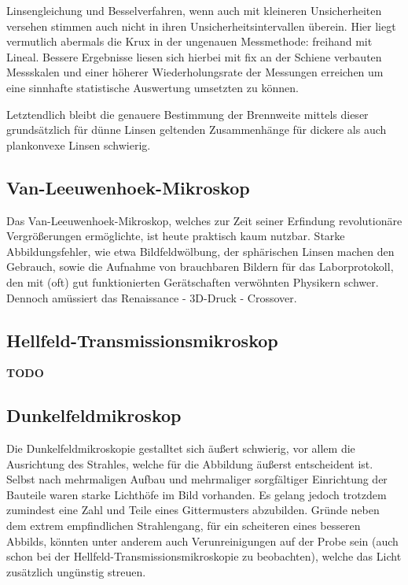 \documentclass[ngerman]{scrartcl}
\begin{document}
Linsengleichung und Besselverfahren, wenn auch mit kleineren Unsicherheiten versehen stimmen auch nicht in ihren Unsicherheitsintervallen überein. Hier liegt vermutlich abermals die Krux in der ungenauen Messmethode: freihand mit Lineal. Bessere Ergebnisse liesen sich hierbei mit fix an der Schiene verbauten Messskalen und einer höherer Wiederholungsrate der Messungen erreichen um eine sinnhafte statistische Auswertung umsetzten zu können.

Letztendlich bleibt die genauere Bestimmung der Brennweite mittels dieser grundsätzlich für dünne Linsen geltenden Zusammenhänge für dickere als auch plankonvexe Linsen schwierig.


\subsection{Van-Leeuwenhoek-Mikroskop}
\label{subsec:diskussion_Leeuwenhoek}

Das Van-Leeuwenhoek-Mikroskop, welches zur Zeit seiner Erfindung revolutionäre Vergrößerungen ermöglichte, ist heute praktisch kaum nutzbar. Starke Abbildungsfehler, wie etwa Bildfeldwölbung, der sphärischen Linsen machen den Gebrauch, sowie die Aufnahme von brauchbaren Bildern für das Laborprotokoll, den mit (oft) gut funktionierten Gerätschaften verwöhnten Physikern schwer. Dennoch amüssiert das Renaissance - 3D-Druck - Crossover.


\subsection{Hellfeld-Transmissionsmikroskop}
\label{subsec:diskussion_hellfeld}

\textbf{TODO}


\subsection{Dunkelfeldmikroskop}
\label{subsec:diskussion_dunkelfeldmikroskop}

Die Dunkelfeldmikroskopie gestalltet sich äußert schwierig, vor allem die Ausrichtung des Strahles, welche für die Abbildung äußerst entscheident ist. Selbst nach mehrmaligen Aufbau und mehrmaliger sorgfältiger Einrichtung der Bauteile waren starke Lichthöfe im Bild vorhanden. Es gelang jedoch trotzdem zumindest eine Zahl und Teile eines Gittermusters abzubilden. Gründe neben dem extrem empfindlichen Strahlengang, für ein scheiteren eines besseren Abbilds, könnten unter anderem auch Verunreinigungen auf der Probe sein (auch schon bei der Hellfeld-Transmissionsmikroskopie zu beobachten), welche das Licht zusätzlich ungünstig streuen.
\end{document}
